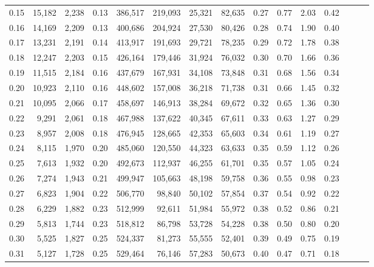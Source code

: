 \begin{tabular}{rrrrrrrrrrrrrrr}
0.15 &  15,182 &  2,238 &  0.13 &  386,517 &  219,093 &   25,321 &   82,635 &  0.27 &  0.77 &  2.03 &      0.42 \\
0.16 &  14,169 &  2,209 &  0.13 &  400,686 &  204,924 &   27,530 &   80,426 &  0.28 &  0.74 &  1.90 &      0.40 \\
0.17 &  13,231 &  2,191 &  0.14 &  413,917 &  191,693 &   29,721 &   78,235 &  0.29 &  0.72 &  1.78 &      0.38 \\
0.18 &  12,247 &  2,203 &  0.15 &  426,164 &  179,446 &   31,924 &   76,032 &  0.30 &  0.70 &  1.66 &      0.36 \\
0.19 &  11,515 &  2,184 &  0.16 &  437,679 &  167,931 &   34,108 &   73,848 &  0.31 &  0.68 &  1.56 &      0.34 \\
0.20 &  10,923 &  2,110 &  0.16 &  448,602 &  157,008 &   36,218 &   71,738 &  0.31 &  0.66 &  1.45 &      0.32 \\
0.21 &  10,095 &  2,066 &  0.17 &  458,697 &  146,913 &   38,284 &   69,672 &  0.32 &  0.65 &  1.36 &      0.30 \\
0.22 &   9,291 &  2,061 &  0.18 &  467,988 &  137,622 &   40,345 &   67,611 &  0.33 &  0.63 &  1.27 &      0.29 \\
0.23 &   8,957 &  2,008 &  0.18 &  476,945 &  128,665 &   42,353 &   65,603 &  0.34 &  0.61 &  1.19 &      0.27 \\
0.24 &   8,115 &  1,970 &  0.20 &  485,060 &  120,550 &   44,323 &   63,633 &  0.35 &  0.59 &  1.12 &      0.26 \\
0.25 &   7,613 &  1,932 &  0.20 &  492,673 &  112,937 &   46,255 &   61,701 &  0.35 &  0.57 &  1.05 &      0.24 \\
0.26 &   7,274 &  1,943 &  0.21 &  499,947 &  105,663 &   48,198 &   59,758 &  0.36 &  0.55 &  0.98 &      0.23 \\
0.27 &   6,823 &  1,904 &  0.22 &  506,770 &   98,840 &   50,102 &   57,854 &  0.37 &  0.54 &  0.92 &      0.22 \\
0.28 &   6,229 &  1,882 &  0.23 &  512,999 &   92,611 &   51,984 &   55,972 &  0.38 &  0.52 &  0.86 &      0.21 \\
0.29 &   5,813 &  1,744 &  0.23 &  518,812 &   86,798 &   53,728 &   54,228 &  0.38 &  0.50 &  0.80 &      0.20 \\
0.30 &   5,525 &  1,827 &  0.25 &  524,337 &   81,273 &   55,555 &   52,401 &  0.39 &  0.49 &  0.75 &      0.19 \\
0.31 &   5,127 &  1,728 &  0.25 &  529,464 &   76,146 &   57,283 &   50,673 &  0.40 &  0.47 &  0.71 &      0.18 \\

\end{tabular}
